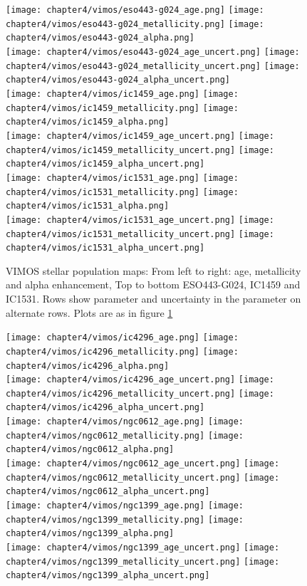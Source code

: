 \begin{figure}
	\centering
	\texttt{[image: chapter4/vimos/eso443-g024\_age.png]}
	\texttt{[image: chapter4/vimos/eso443-g024\_metallicity.png]}
	\texttt{[image: chapter4/vimos/eso443-g024\_alpha.png]}
	\\
	\texttt{[image: chapter4/vimos/eso443-g024\_age\_uncert.png]}
	\texttt{[image: chapter4/vimos/eso443-g024\_metallicity\_uncert.png]}
	\texttt{[image: chapter4/vimos/eso443-g024\_alpha\_uncert.png]}
	\\
	\texttt{[image: chapter4/vimos/ic1459\_age.png]}
	\texttt{[image: chapter4/vimos/ic1459\_metallicity.png]}
	\texttt{[image: chapter4/vimos/ic1459\_alpha.png]}
	\\
	\texttt{[image: chapter4/vimos/ic1459\_age\_uncert.png]}
	\texttt{[image: chapter4/vimos/ic1459\_metallicity\_uncert.png]}
	\texttt{[image: chapter4/vimos/ic1459\_alpha\_uncert.png]}
	\\
	\texttt{[image: chapter4/vimos/ic1531\_age.png]}
	\texttt{[image: chapter4/vimos/ic1531\_metallicity.png]}
	\texttt{[image: chapter4/vimos/ic1531\_alpha.png]}
	\\
	\texttt{[image: chapter4/vimos/ic1531\_age\_uncert.png]}
	\texttt{[image: chapter4/vimos/ic1531\_metallicity\_uncert.png]}
	\texttt{[image: chapter4/vimos/ic1531\_alpha\_uncert.png]}
	\\
	\caption[VIMOS stellar population maps]{VIMOS stellar population maps: From left to right: age, metallicity and alpha enhancement, Top to bottom ESO443-G024, IC1459 and IC1531. Rows show parameter and uncertainty in the parameter on alternate rows. Plots are as in figure \ref{fig:VIMOS_stellar}}
	\label{fig:VIMOS_stellar}
\end{figure}

\begin{figure}
	\centering
	\texttt{[image: chapter4/vimos/ic4296\_age.png]}
	\texttt{[image: chapter4/vimos/ic4296\_metallicity.png]}
	\texttt{[image: chapter4/vimos/ic4296\_alpha.png]}
	\\
	\texttt{[image: chapter4/vimos/ic4296\_age\_uncert.png]}
	\texttt{[image: chapter4/vimos/ic4296\_metallicity\_uncert.png]}
	\texttt{[image: chapter4/vimos/ic4296\_alpha\_uncert.png]}
	\\
	\texttt{[image: chapter4/vimos/ngc0612\_age.png]}
	\texttt{[image: chapter4/vimos/ngc0612\_metallicity.png]}
	\texttt{[image: chapter4/vimos/ngc0612\_alpha.png]}
	\\
	\texttt{[image: chapter4/vimos/ngc0612\_age\_uncert.png]}
	\texttt{[image: chapter4/vimos/ngc0612\_metallicity\_uncert.png]}
	\texttt{[image: chapter4/vimos/ngc0612\_alpha\_uncert.png]}
	\\
	\texttt{[image: chapter4/vimos/ngc1399\_age.png]}
	\texttt{[image: chapter4/vimos/ngc1399\_metallicity.png]}
	\texttt{[image: chapter4/vimos/ngc1399\_alpha.png]}
	\\
	\texttt{[image: chapter4/vimos/ngc1399\_age\_uncert.png]}
	\texttt{[image: chapter4/vimos/ngc1399\_metallicity\_uncert.png]}
	\texttt{[image: chapter4/vimos/ngc1399\_alpha\_uncert.png]}
	\\
\end{figure}

